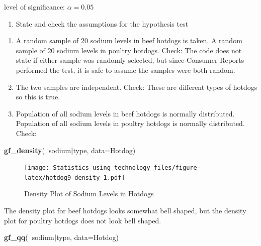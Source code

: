 \documentclass[
]{book}
\newenvironment{Shaded}{\begin{snugshade}}{\end{snugshade}}
\newcommand{\DataTypeTok}[1]{\textcolor[rgb]{0.13,0.29,0.53}{#1}}
\newcommand{\KeywordTok}[1]{\textcolor[rgb]{0.13,0.29,0.53}{\textbf{#1}}}
\newcommand{\NormalTok}[1]{#1}
\newcommand{\OperatorTok}[1]{\textcolor[rgb]{0.81,0.36,0.00}{\textbf{#1}}}
\providecommand{\tightlist}{%
  \setlength{\itemsep}{0pt}\setlength{\parskip}{0pt}}
\begin{document}
level of significance: \(\alpha=0.05\)

\begin{enumerate}
\def\labelenumi{\arabic{enumi}.}
\setcounter{enumi}{2}
\tightlist
\item
  State and check the assumptions for the hypothesis test
\end{enumerate}

\begin{enumerate}
\def\labelenumi{\alph{enumi}.}
\item
  A random sample of 20 sodium levels in beef hotdogs is taken. A random sample of 20 sodium levels in poultry hotdogs. Check: The code does not state if either sample was randomly selected, but since Consumer Reports performed the test, it is safe to assume the samples were both random.
\item
  The two samples are independent. Check: These are different types of hotdogs so this is true.
\item
  Population of all sodium levels in beef hotdogs is normally distributed. Population of all sodium levels in poultry hotdogs is normally distributed. Check:
\end{enumerate}



\begin{Shaded}
\begin{Highlighting}[]
\KeywordTok{gf_density}\NormalTok{(}\OperatorTok{~}\NormalTok{sodium}\OperatorTok{|}\NormalTok{type, }\DataTypeTok{data=}\NormalTok{Hotdog)}
\end{Highlighting}
\end{Shaded}

\begin{figure}
\centering
\texttt{[image: Statistics\_using\_technology\_files/figure-latex/hotdog9-density-1.pdf]}
\caption{\label{fig:hotdog9-density}Density Plot of Sodium Levels in Hotdogs}
\end{figure}

The density plot for beef hotdogs looks somewhat bell shaped, but the density plot for poultry hotdogs does not look bell shaped.



\begin{Shaded}
\begin{Highlighting}[]
\KeywordTok{gf_qq}\NormalTok{(}\OperatorTok{~}\NormalTok{sodium}\OperatorTok{|}\NormalTok{type, }\DataTypeTok{data=}\NormalTok{Hotdog)}
\end{Highlighting}
\end{Shaded}
\end{document}
